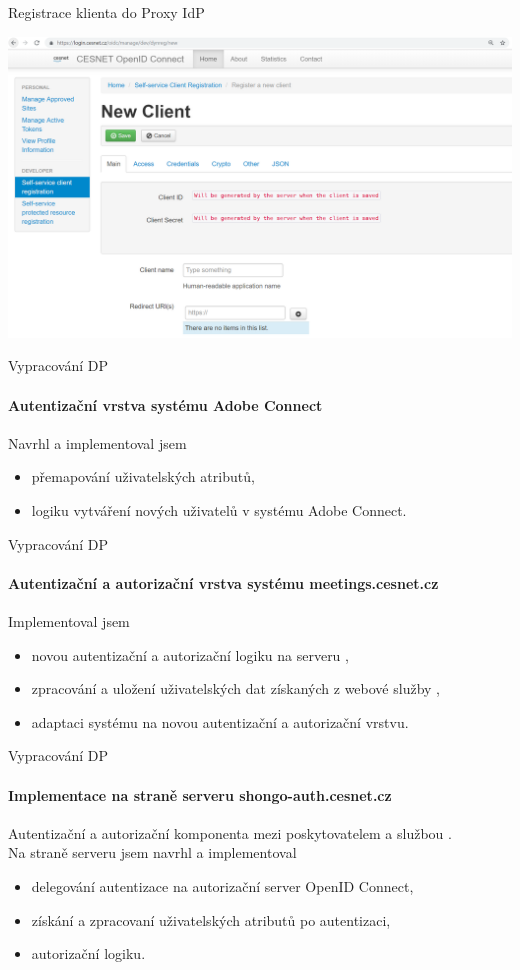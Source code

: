 \documentclass[
]{beamer}
\begin{document}
\begin{frame}{Registrace klienta do Proxy IdP}

\includegraphics[width=\textwidth]{pics/oidcRegistration}
\end{frame}

\begin{frame}{Vypracování DP}
\framesubtitle{Autentizační vrstva systému Adobe Connect}
Navrhl a implementoval jsem
\begin{itemize}
    \item přemapování uživatelských atributů,
    \item logiku vytváření nových uživatelů v systému Adobe Connect.
\end{itemize}
\end{frame}

\begin{frame}{Vypracování DP}
\framesubtitle{Autentizační a autorizační vrstva systému meetings.cesnet.cz}
Implementoval jsem
\begin{itemize}
    \item novou autentizační a autorizační logiku na serveru ,
    \item zpracování a uložení uživatelských dat získaných z webové služby ,
    \item adaptaci systému  na novou autentizační a autorizační vrstvu.
\end{itemize}
\end{frame}

\begin{frame}{Vypracování DP}
\framesubtitle{Implementace na straně serveru shongo-auth.cesnet.cz}

Autentizační a autorizační komponenta mezi poskytovatelem  a službou .
\\
\medskip
Na straně serveru  jsem navrhl a implementoval 
\begin{itemize}
    \item delegování autentizace na autorizační server OpenID Connect,
    \item získání a zpracovaní uživatelských atributů po autentizaci,
    \item autorizační logiku. 
\end{itemize}
\end{frame}
\end{document}
